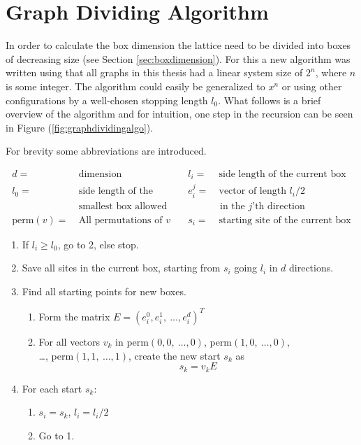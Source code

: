 \section{Graph Dividing Algorithm}
\label{sec:GraphDivisonAlgorithm}


In order to calculate the box dimension the lattice need to be divided into boxes of decreasing size (see Section \ref{sec:boxdimension}). For this a new algorithm was written using that all graphs in this thesis had a linear system size of $2^{n}$, where $n$ is some integer. The algorithm could easily be generalized to $x^n$ or using other configurations by a well-chosen stopping length $l_0$. What follows is a brief overview of the algorithm and for intuition, one step in the recursion can be seen in Figure (\ref{fig:graphdividingalgo}).

For brevity some abbreviations are introduced.

\begin{equation*}
    \begin{aligned}
        d =& \ \text{dimension} &\quad l_i =& \ \text{side length of the current box}\\
%
        l_0 =& \ \text{side length of the} &\quad e_i^j =& \ \text{vector of length } l_i / 2 \\
%
             & \ \text{smallest box allowed} & & \text{ in the }j\text{'th direction} \\
%
        \text{perm}(v) =& \ \text{All permutations of } v &\quad s_i =& \ \text{starting site of the current box}
    \end{aligned}
\end{equation*}

\begin{enumerate}
    \item If $l_i \geq l_0$, go to 2, else stop.
%
    \item Save all sites in the current box, starting from $s_i$ going $l_i$ in $d$ directions.
%
    \item Find all starting points for new boxes.
%
    \begin{enumerate}[label=(\roman*)]
%
        \item Form the matrix $E = (e_i^0, e_i^1, \  \ldots, e_i^d)^T$
%
        \item For all vectors $v_k$ in perm$(0, 0, \ \ldots , 0)$, perm$(1, 0, \ \ldots , 0)$, \\ \ldots, perm$(1, 1, \ \ldots , 1)$, create the new start $s_k$ as $$s_k = v_k E$$
%
    \end{enumerate}
%
    \item For each start $s_k$:
    \begin{enumerate}[label=(\roman*)]
        \item $s_i = s_k$, $l_i = l_i / 2$
        \item Go to 1.
    \end{enumerate}
%
\end{enumerate}


